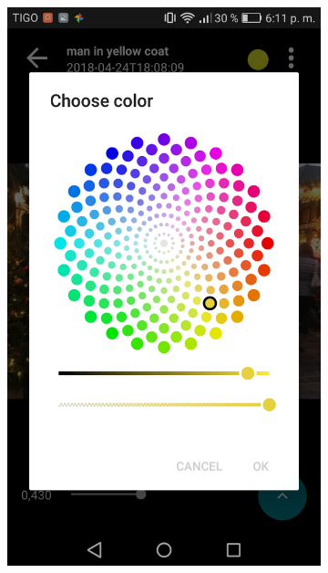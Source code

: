 \begin{figure}[!htbp]
    \centering
    \begin{multicols}{3}
    \begin{subfigure}[b]{\columnwidth}
            \centering
            \includegraphics[width=\textwidth]{./figures/dmn_app/views/12.png}
    \label{subfig:color_chose}
    \end{subfigure}
    

\end{multicols}
\end{figure}

